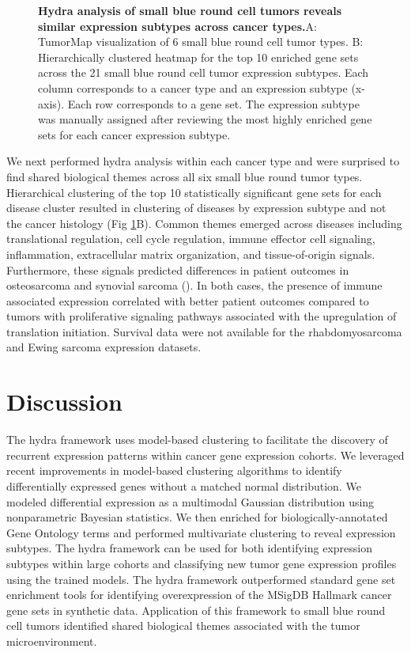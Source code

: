 \documentclass[10pt,letterpaper]{article}
\begin{document}
\begin{figure}[!h]
	\caption{{\bf Hydra analysis of small blue round cell tumors reveals similar expression subtypes across cancer types.}A: TumorMap visualization of 6 small blue round cell tumor types. B: Hierarchically clustered heatmap for the top 10 enriched gene sets across the 21 small blue round cell tumor expression subtypes. Each column corresponds to a cancer type and an expression subtype (x-axis). Each row corresponds to a gene set. The expression subtype was manually assigned after reviewing the most highly enriched gene sets for each cancer expression subtype.}
	\label{pancan}
\end{figure}

We next performed hydra analysis within each cancer type and were surprised to find shared biological themes across all six small blue round tumor types. Hierarchical clustering of the top 10 statistically significant gene sets for each disease cluster resulted in clustering of diseases by expression subtype and not the cancer histology (Fig \ref{pancan}B). Common themes emerged across diseases including translational regulation, cell cycle regulation, immune effector cell signaling, inflammation, extracellular matrix organization, and tissue-of-origin signals. Furthermore, these signals predicted differences in patient outcomes in osteosarcoma and synovial sarcoma (). In both cases, the presence of immune associated expression correlated with better patient outcomes compared to tumors with proliferative signaling pathways associated with the upregulation of translation initiation. Survival data were not available for the rhabdomyosarcoma and Ewing sarcoma expression datasets.

\section*{Discussion}
The hydra framework uses model-based clustering to facilitate the discovery of recurrent expression patterns within cancer gene expression cohorts. We leveraged recent improvements in model-based clustering algorithms to identify differentially expressed genes without a matched normal distribution. We modeled differential expression as a multimodal Gaussian distribution using nonparametric Bayesian statistics. We then enriched for biologically-annotated Gene Ontology terms and performed multivariate clustering to reveal expression subtypes. The hydra framework can be used for both identifying expression subtypes within large cohorts and classifying new tumor gene expression profiles using the trained models. The hydra framework outperformed standard gene set enrichment tools for identifying overexpression of the MSigDB Hallmark cancer gene sets in synthetic data. Application of this framework to small blue round cell tumors identified shared biological themes associated with the tumor microenvironment.
 
\end{document}
